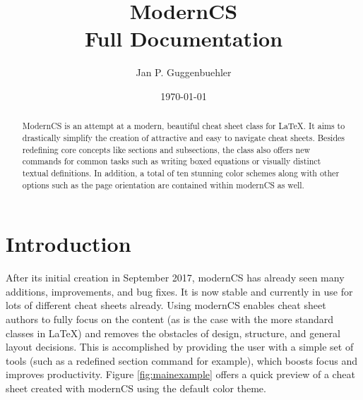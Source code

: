 \documentclass{article}
\begin{document}
\title{ModernCS \\ Full Documentation}
\author{Jan P. Guggenbuehler}
\date{\today}
\maketitle
\begin{abstract}
	\noindent ModernCS is an attempt at a modern, beautiful cheat sheet class for \LaTeX. It aims to drastically simplify the creation of attractive and easy to navigate cheat sheets. Besides redefining core concepts like sections and subsections, the class also offers new commands for common tasks such as writing boxed equations or visually distinct textual definitions. In addition, a total of ten stunning color schemes along with other options such as the page orientation are contained within modernCS as well.
\end{abstract}
\tableofcontents
\section{Introduction}
After its initial creation in September 2017, modernCS has already seen many additions, improvements, and bug fixes. It is now stable and currently in use for lots of different cheat sheets already. Using modernCS enables cheat sheet authors to fully focus on the content (as is the case with the more standard classes in \LaTeX) and removes the obstacles of design, structure, and general layout decisions. This is accomplished by providing the user with a simple set of tools (such as a redefined section command for example), which boosts focus and improves productivity. Figure \ref{fig:mainexample} offers a quick preview of a cheat sheet created with modernCS using the default color theme.
\end{document}
